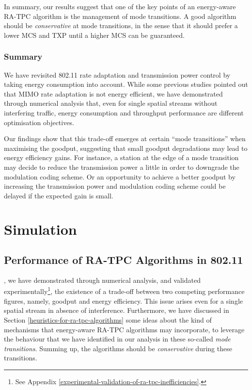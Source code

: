 \documentclass[twoside,nohyper]{tufte-book}
\newcommand{\partseparator}{
  \noindent\leavevmode\leaders\hrule height 0.8ex depth \dimexpr0.4pt-0.8ex\hfill\kern0pt
  \newline~\vspace{-0.5\baselineskip}\newline}
\begin{document}
In summary, our results suggest that one of the key points of an energy-aware RA-TPC algorithm is the management of mode transitions. A good algorithm should be \emph{conservative} at mode transitions, in the sense that it should prefer a lower MCS and TXP until a higher MCS can be guaranteed.

\hypertarget{summary-3}{%
\section{Summary}\label{summary-3}}

We have revisited 802.11 rate adaptation and transmission power control by taking energy consumption into account. While some previous studies pointed out that MIMO rate adaptation is not energy efficient, we have demonstrated through numerical analysis that, even for single spatial streams without interfering traffic, energy consumption and throughput performance are different optimisation objectives.

Our findings\cite[0pt]{contrib-06} show that this trade-off emerges at certain ``mode transitions'' when maximising the goodput, suggesting that small goodput degradations may lead to energy efficiency gains. For instance, a station at the edge of a mode transition may decide to reduce the transmission power a little in order to downgrade the modulation coding scheme. Or an opportunity to achieve a better goodput by increasing the transmission power and modulation coding scheme could be delayed if the expected gain is small.

\addtocontents{toc}{\partseparator}

\hypertarget{part-simulation}{%
\part{Simulation}\label{part-simulation}}

\hypertarget{ch:07}{%
\chapter{Performance of RA-TPC Algorithms in 802.11}\label{ch:07}}

, we have demonstrated through numerical analysis, and validated experimentally\footnote{See Appendix \ref{experimental-validation-of-ra-tpc-inefficiencies}.}, the existence of a trade-off between two competing performance figures, namely, goodput and energy efficiency. This issue arises even for a single spatial stream in absence of interference. Furthermore, we have discussed in Section \ref{heuristics-for-ra-tpc-algorithms} some ideas about the kind of mechanisms that energy-aware RA-TPC algorithms may incorporate, to leverage the behaviour that we have identified in our analysis in these so-called \emph{mode transitions}. Summing up, the algorithms should be \emph{conservative} during these transitions.
\end{document}
